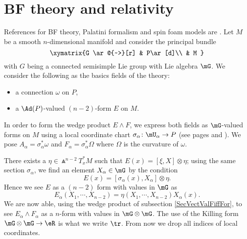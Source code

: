 \section{BF theory and relativity}

References for BF theory, Palatini formalism and spin foam models are \cite{bkindep,degesols,itospinfoam,BenyAshHamil}. Let $M$ be a smooth $n$-dimensional manifold and consider the principal bundle
\begin{equation}
\xymatrix{%
 G   \ar@{~>}[r]		&	P\ar[d]\\
   				&	M
 }
\end{equation}
with $G$ being a connected semisimple Lie group with Lie algebra $\mG$. We consider the following as the basics fields of the theory:
\begin{itemize}
\item a connection $\omega$ on $P$,
\item a $\Ad(P)$-valued $(n-2)$-form $E$ on $M$.
\end{itemize}
In order to form the wedge product $E\wedge F$, we express both fields as $\mG$-valued forms on $M$ using a local coordinate chart $\sigma_{\alpha}\colon \mU_{\alpha}\to P$ (see pages \pageref{PgLocSecCurv} and \pageref{PgLocSecConn} ). We pose $A_{\alpha}=\sigma_{\alpha}^*\omega$ and $F_{\alpha}=\sigma_{\alpha}^*\Omega$ where $\Omega$ is the curvature of $\omega$.

There exists a $\eta\in\Wedge^{n-2}T_x^*M$ such that $E(x)=[\xi,X]\otimes\eta$; using the same section $\sigma_{\alpha}$, we find an element $X_{\alpha}\in\mG$ by the condition
\[ 
  E(x)=[\sigma_{\alpha}(x),X_{\alpha}]\otimes\eta.
\]
Hence we see $E$ as a $(n-2)$ form with values in $\mG$ as
\begin{equation}
E_{\alpha}(X_1,\cdots,X_{n-2})=\eta(X_1,\cdots,X_{n-2})X_{\alpha}(x).
\end{equation}
We are now able, using the wedge product of subsection \ref{SecVectValFiffFor}, to see $E_{\alpha}\wedge F_{\alpha}$ as a $n$-form with values in $\mG\otimes\mG$. The use of the Killing form $\mG\otimes\mG\to\eR$ is what we write $\tr$. From now we drop all indices of local coordinates.

